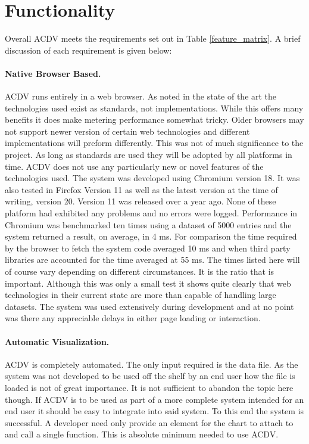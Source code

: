\documentclass[a4paper, 11pt, titlepage, onehalfspacing]{report}
\begin{document}
\section{Functionality}
\label{Functionality}
Overall AC\lightning{}DV meets the requirements set out in Table \ref{feature_matrix}. A brief discussion of each requirement is given below:

\paragraph{Native Browser Based.}AC\lightning{}DV runs entirely in a web browser. As noted in the state of the art the technologies used exist as standards, not implementations. While this offers many benefits it does make metering performance somewhat tricky. Older browsers may not support newer version of certain web technologies and different implementations will preform differently. This was not of much significance to the project. As long as standards are used they will be adopted by all platforms in time. AC\lightning{}DV does not use any particularly new or novel features of the technologies used. The system was developed using Chromium version 18. It was also tested in Firefox Version 11 as well as the latest version at the time of writing, version 20. Version 11 was released over a year ago. None of these platform had exhibited any problems and no errors were logged. Performance in Chromium was benchmarked ten times using a dataset of 5000 entries and the system returned a result, on average, in 4 ms. For comparison the time required by the browser to fetch the system code averaged 10 ms and when third party libraries are accounted for the time averaged at 55 ms. The times listed here will of course vary depending on different circumstances. It is the ratio that is important. Although this was only a small test it shows quite clearly that web technologies in their current state are more than capable of handling large datasets. The system was used extensively during development and at no point was there any appreciable delays in either page loading or interaction.

\paragraph{Automatic Visualization.}AC\lightning{}DV is completely automated. The only input required is the data file. As the system was not developed to be used off the shelf by an end user how the file is loaded is not of great importance. It is not sufficient to abandon the topic here though. If AC\lightning{}DV is to be used as part of a more complete system intended for an end user it should be easy to integrate into said system. To this end the system is successful. A developer need only provide an element for the chart to attach to and call a single function. This is absolute minimum needed to use AC\lightning{}DV.
\end{document}
